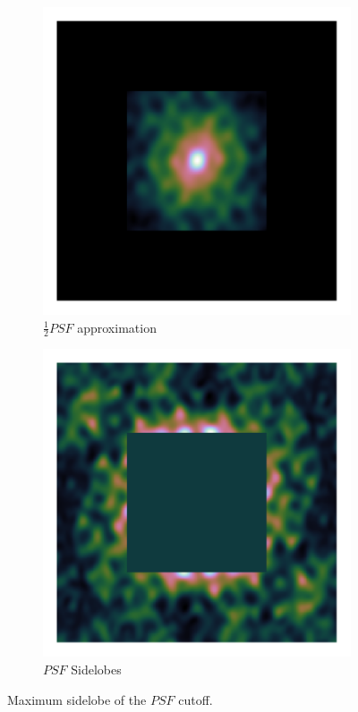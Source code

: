 \begin{figure}[h]
	\centering
	\begin{subfigure}[b]{0.3\linewidth}
		\includegraphics[width=\linewidth, clip, trim= 0.25in 0.25in 0.25in 0.25in]{./chapters/03.cd/simulated/psfCut.png}
		\caption{$\frac{1}{2}PSF$ approximation}
	\end{subfigure}
	\begin{subfigure}[b]{0.3\linewidth}
		\includegraphics[width=\linewidth, clip, trim= 0.25in 0.25in 0.25in 0.25in]{./chapters/03.cd/simulated/psfReverseCut.png}
		\caption{$PSF$ Sidelobes}
		\label{gradient:convergence:reverseCut}
	\end{subfigure}
	
	\caption{Maximum sidelobe of the $PSF$ cutoff.}
	\label{gradient:convergence:sidelobe}
\end{figure}

